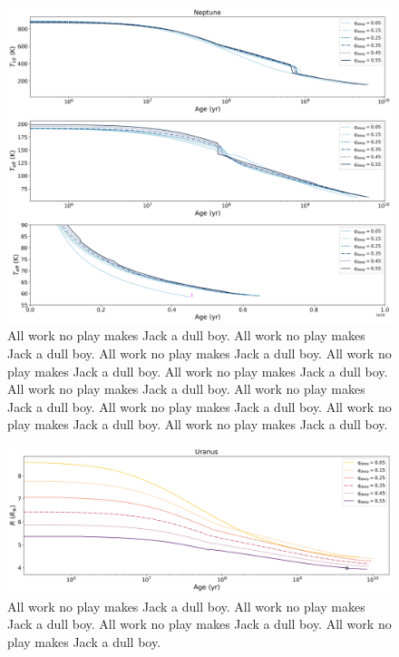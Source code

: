 \documentclass[11pt]{ucscthesisbs}
\begin{document}
\begin{figure}[ht]
 \centerline{
  \includegraphics[scale=0.45]{figures/n_cooling_curves_nz_4096_more_qdeeps.png}
 }
\caption[Inhibition of convection on Uranus]
{All work no play makes Jack a dull boy. All work no play makes Jack a dull boy. All work no play makes Jack a dull boy. All work no play makes Jack a dull boy. All work no play makes Jack a dull boy. All work no play makes Jack a dull boy. All work no play makes Jack a dull boy. All work no play makes Jack a dull boy. All work no play makes Jack a dull boy. All work no play makes Jack a dull boy. }
\label{fig:evolve_neptune_qdeeps}
\end{figure}



\begin{figure}[ht]
 \centerline{
  \includegraphics[scale=0.45]{figures/u_cooling_radius_nz_4096_logx_more_qdeeps.png}
 }
\caption[Inhibition of convection on Uranus]
{All work no play makes Jack a dull boy. All work no play makes Jack a dull boy. All work no play makes Jack a dull boy. All work no play makes Jack a dull boy.  }
\label{fig:evolve_uranus_radius}
\end{figure}
\end{document}
